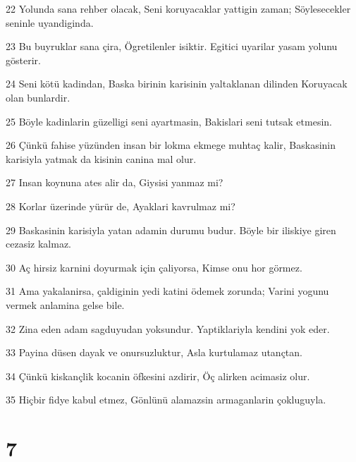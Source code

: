 \par 22 Yolunda sana rehber olacak, Seni koruyacaklar yattigin zaman; Söylesecekler seninle uyandiginda.
\par 23 Bu buyruklar sana çira, Ögretilenler isiktir. Egitici uyarilar yasam yolunu gösterir.
\par 24 Seni kötü kadindan, Baska birinin karisinin yaltaklanan dilinden Koruyacak olan bunlardir.
\par 25 Böyle kadinlarin güzelligi seni ayartmasin, Bakislari seni tutsak etmesin.
\par 26 Çünkü fahise yüzünden insan bir lokma ekmege muhtaç kalir, Baskasinin karisiyla yatmak da kisinin canina mal olur.
\par 27 Insan koynuna ates alir da, Giysisi yanmaz mi?
\par 28 Korlar üzerinde yürür de, Ayaklari kavrulmaz mi?
\par 29 Baskasinin karisiyla yatan adamin durumu budur. Böyle bir iliskiye giren cezasiz kalmaz.
\par 30 Aç hirsiz karnini doyurmak için çaliyorsa, Kimse onu hor görmez.
\par 31 Ama yakalanirsa, çaldiginin yedi katini ödemek zorunda; Varini yogunu vermek anlamina gelse bile.
\par 32 Zina eden adam sagduyudan yoksundur. Yaptiklariyla kendini yok eder.
\par 33 Payina düsen dayak ve onursuzluktur, Asla kurtulamaz utançtan.
\par 34 Çünkü kiskançlik kocanin öfkesini azdirir, Öç alirken acimasiz olur.
\par 35 Hiçbir fidye kabul etmez, Gönlünü alamazsin armaganlarin çokluguyla.

\chapter{7}

